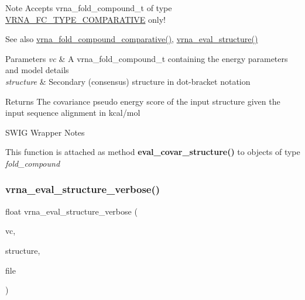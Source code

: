 \begin{DoxyNote}{Note}
Accepts vrna\+\_\+fold\+\_\+compound\+\_\+t of type \mbox{\hyperlink{group__fold__compound_gga01a4ff86fa71deaaa5d1abbd95a1447dab821ce46ea3cf665be97df22a76f5023}{V\+R\+N\+A\+\_\+\+F\+C\+\_\+\+T\+Y\+P\+E\+\_\+\+C\+O\+M\+P\+A\+R\+A\+T\+I\+VE}} only!
\end{DoxyNote}
\begin{DoxySeeAlso}{See also}
\mbox{\hyperlink{group__fold__compound_gad6bacc816af274922b13d947f708aa0c}{vrna\+\_\+fold\+\_\+compound\+\_\+comparative()}}, \mbox{\hyperlink{group__eval_ga58f199f1438d794a265f3b27fc8ea631}{vrna\+\_\+eval\+\_\+structure()}}
\end{DoxySeeAlso}

\begin{DoxyParams}{Parameters}
{\em vc} & A vrna\+\_\+fold\+\_\+compound\+\_\+t containing the energy parameters and model details \\
\hline
{\em structure} & Secondary (consensus) structure in dot-\/bracket notation \\
\hline
\end{DoxyParams}
\begin{DoxyReturn}{Returns}
The covariance pseudo energy score of the input structure given the input sequence alignment in kcal/mol
\end{DoxyReturn}
\begin{DoxyRefDesc}{S\+W\+I\+G Wrapper Notes}
\item[\mbox{\hyperlink{wrappers__wrappers000029}{S\+W\+I\+G Wrapper Notes}}]This function is attached as method {\bfseries eval\+\_\+covar\+\_\+structure()} to objects of type {\itshape fold\+\_\+compound} \end{DoxyRefDesc}
\mbox{\label{group__eval_ga0928d699d310178f84ee2351034e5cb5}} 
\subsubsection{\texorpdfstring{vrna\+\_\+eval\+\_\+structure\+\_\+verbose()}{vrna\_eval\_structure\_verbose()}}
{\footnotesize\ttfamily float vrna\+\_\+eval\+\_\+structure\+\_\+verbose (\begin{DoxyParamCaption}\item[{\mbox{\hyperlink{group__fold__compound_ga1b0cef17fd40466cef5968eaeeff6166}{vrna\+\_\+fold\+\_\+compound\+\_\+t}} $\ast$}]{vc,  }\item[{const char $\ast$}]{structure,  }\item[{F\+I\+LE $\ast$}]{file }\end{DoxyParamCaption})}



